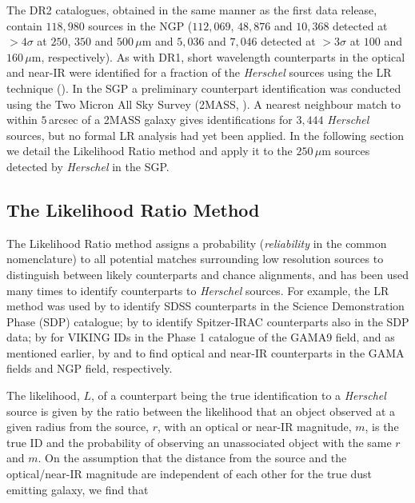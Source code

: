 The DR2 catalogues, obtained in the same manner as the first data release, contain $118,980$ sources in the NGP ($112,069$, $48,876$ and $10,368$ detected at $> 4\sigma$ at $250$, $350$ and $500\,\mu$m and $5,036$ and $7,046$ detected at $> 3\sigma$ at $100$ and $160\,\mu$m, respectively). As with DR1, short wavelength counterparts in the optical and near-IR were identified for a fraction of the \textit{Herschel} sources using the LR technique (\citealt{Furlanetto_2018}). In the SGP a preliminary counterpart identification was conducted using the Two Micron All Sky Survey (2MASS, \citealt{Skrutskie_2006}). A nearest neighbour match to within $5\,$arcsec of a 2MASS galaxy gives identifications for $3,444$ \textit{Herschel} sources, but no formal LR analysis had yet been applied. In the following section we detail the Likelihood Ratio method and apply it to the $250\,\mu$m sources detected by \textit{Herschel} in the SGP.

\subsection{The Likelihood Ratio Method}
\label{sec:The Likelihood Ratio Method}

The Likelihood Ratio method assigns a probability (\textit{reliability} in the common nomenclature) to all potential matches surrounding low resolution sources to distinguish between likely counterparts and chance alignments, and has been used many times to identify counterparts to \textit{Herschel} sources. For example, the LR method was used by \citealt{Smith_2011} to identify SDSS counterparts in the Science Demonstration Phase (SDP) catalogue; by \citealt{Kim_2012} to identify Spitzer-IRAC counterparts also in the SDP data; by \citealt{Fleuren_2012} for VIKING IDs in the Phase 1 catalogue of the GAMA9 field, and as mentioned earlier, by \citealt{Bourne_2016} and \citealt{Furlanetto_2018} to find optical and near-IR counterparts in the GAMA fields and NGP field, respectively.

The likelihood, $L$, of a counterpart being the true identification to a \textit{Herschel} source is given by the ratio between the likelihood that an object observed at a given radius from the source, $r$, with an optical or near-IR magnitude, $m$, is the true ID and the probability of observing an unassociated object with the same $r$ and $m$. On the assumption that the distance from the source and the optical/near-IR magnitude are independent of each other for the true dust emitting galaxy, we find that

